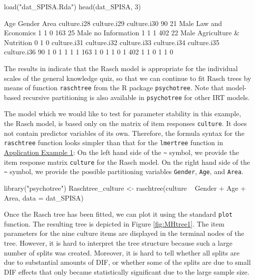\documentclass[doc,floatsintext,natbib]{apa7}
\begin{document}
\begin{Schunk}
\begin{Sinput}
 load("dat_SPISA.Rda")
 head(dat_SPISA, 3)
\end{Sinput}
\begin{Soutput}
    Age Gender                    Area culture.i28 culture.i29 culture.i30
90   21   Male       Law and Economics           1           1           0
163  25   Male          no Information           1           1           1
402  22   Male Agriculture & Nutrition           0           1           0
    culture.i31 culture.i32 culture.i33 culture.i34 culture.i35 culture.i36
90            1           0           1           1           1           1
163           1           0           1           1           0           1
402           1           1           0           1           1           0
\end{Soutput}
\end{Schunk}

The results in \citet{SPISA:book} indicate that the Rasch model is appropriate for the individual scales of the general knowledge quiz, so that we can continue to fit Rasch trees by means of function \texttt{raschtree} from the R package \texttt{psychotree}. Note that model-based recursive partitioning is also available in \texttt{psychotree} for other IRT models.

The model which we would like to test for parameter stability in this example, the Rasch model, is based only on the matrix of item responses \texttt{culture}. It does not contain predictor variables of its own. Therefore, the formula syntax for the \texttt{raschtree} function looks simpler than that for the \texttt{lmertree} function in \hyperref[sec:TutorialMixed]{Application Example 1}: On the left hand side of the \verb|~| symbol, we provide the item response matrix \texttt{culture} for the Rasch model. On the right hand side of the \verb|~| symbol, we provide the possible partitioning variables \texttt{Gender}, \texttt{Age}, and \texttt{Area}.



\begin{Schunk}
\begin{Sinput}
 library("psychotree")
 Raschtree_culture <- raschtree(culture ~  Gender + Age + Area,
                                data = dat_SPISA)
\end{Sinput}
\end{Schunk}

Once the Rasch tree has been fitted, we can plot it using the standard \texttt{plot} function. The resulting tree is depicted in Figure \ref{fig:MHtree1}. The item parameters for the nine culture items are displayed in the terminal nodes of the tree. However, it is hard to interpret the tree structure because such a large number of splits was created. Moreover, it is hard to tell whether all splits are due to substantial amounts of DIF, or whether some of the splits are due to small DIF effects that only became statistically significant due to the large sample size.
\end{document}
